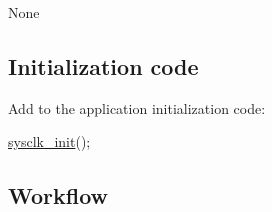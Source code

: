 \begin{DoxyItemize}
\item None
\end{DoxyItemize}\hypertarget{sysclk_quickstart_sysclk_quickstart_use_case_1_setup_steps}{}\subsection{Initialization code}\label{sysclk_quickstart_sysclk_quickstart_use_case_1_setup_steps}
Add to the application initialization code\-: 
\begin{DoxyCode}
        \hyperlink{group__sysclk__group_ga242399e48a97739c88b4d0c00f6101de}{sysclk\_init}();
\end{DoxyCode}
\hypertarget{sysclk_quickstart_sysclk_quickstart_use_case_1_setup_steps_workflow}{}\subsection{Workflow}\label{sysclk_quickstart_sysclk_quickstart_use_case_1_setup_steps_workflow}


